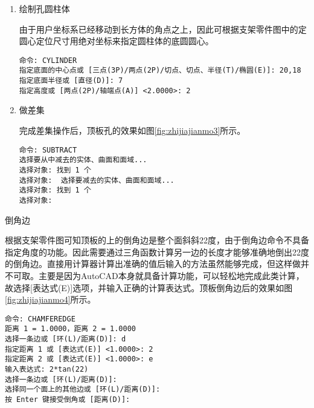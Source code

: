 \begin{procedure}
\begin{enumerate}
\item 绘制孔圆柱体

由于用户坐标系已经移动到长方体的角点之上，因此可根据支架零件图中的定圆心定位尺寸用绝对坐标来指定圆柱体的底圆圆心。

\begin{lstlisting}
命令: CYLINDER
指定底面的中心点或 [三点(3P)/两点(2P)/切点、切点、半径(T)/椭圆(E)]: 20,18
指定底面半径或 [直径(D)]: 7
指定高度或 [两点(2P)/轴端点(A)] <2.0000>: 2
\end{lstlisting}


\item 做差集

完成差集操作后，顶板孔的效果如图\ref{fig:zhijiajianmo3}所示。
\begin{lstlisting}
命令: SUBTRACT 
选择要从中减去的实体、曲面和面域...
选择对象: 找到 1 个
选择对象:  选择要减去的实体、曲面和面域...
选择对象: 找到 1 个
选择对象:
\end{lstlisting}

\end{enumerate}

\begin{figure}[htbp]
\centering
\begin{floatrow}[2]
\end{floatrow}
\end{figure}
\item 倒角边

根据支架零件图可知顶板的上的倒角边是整个面斜斜22度，由于倒角边命令不具备指定角度的功能。因此需要通过三角函数计算另一边的长度才能够准确地倒出22度的倒角边。直接用计算器计算出准确的值后输入的方法虽然能够完成，但这样做并不可取。主要是因为AutoCAD本身就具备计算功能，可以轻松地完成此类计算，故选择[表达式(E)]选项，并输入正确的计算表达式。顶板倒角边后的效果如图\ref{fig:zhijiajianmo4}所示。


\begin{lstlisting}
命令: CHAMFEREDGE
距离 1 = 1.0000，距离 2 = 1.0000
选择一条边或 [环(L)/距离(D)]: d
指定距离 1 或 [表达式(E)] <1.0000>: 2
指定距离 2 或 [表达式(E)] <1.0000>: e
输入表达式: 2*tan(22)
选择一条边或 [环(L)/距离(D)]:
选择同一个面上的其他边或 [环(L)/距离(D)]:
按 Enter 键接受倒角或 [距离(D)]:
\end{lstlisting}

\end{procedure}

